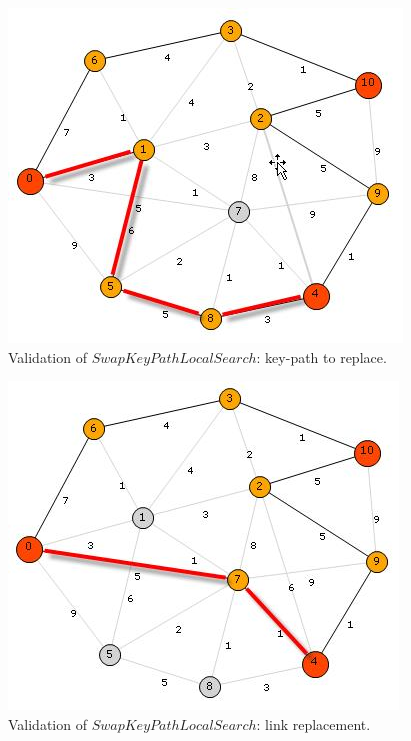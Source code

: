 \begin{figure}[H]
\begin{center}
\includegraphics[scale=0.9]{36.jpg}
\caption{Validation of $SwapKeyPathLocalSearch$: key-path to replace.}\label{fig:36}
\end{center} 
\end{figure}

\begin{figure}[H]
\begin{center}
\includegraphics[scale=0.9]{37.jpg}
\caption{Validation of $SwapKeyPathLocalSearch$: link replacement.}\label{fig:37}
\end{center} 
\end{figure}

